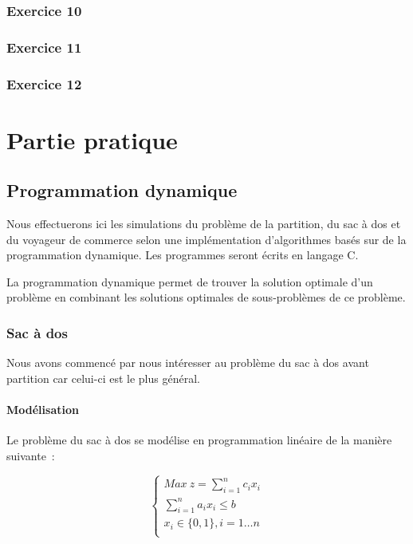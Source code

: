 \documentclass[a4paper, 12pt]{article}
\begin{document}
\subsubsection*{Exercice 10}


\subsubsection*{Exercice 11}


\subsubsection*{Exercice 12}


\pagebreak

\section{Partie pratique}

\subsection{Programmation dynamique}

Nous effectuerons ici les simulations du problème de la partition, du sac
à dos et du voyageur de commerce selon une implémentation
d'algorithmes basés sur de la programmation dynamique. Les programmes
seront écrits en langage C.

La programmation dynamique permet de trouver la solution optimale d'un
problème en combinant les solutions optimales de sous-problèmes de ce
problème.

\subsubsection{Sac à dos}

Nous avons commencé par nous intéresser au problème du sac à dos avant
partition car celui-ci est le plus général.

\paragraph{Modélisation}

Le problème du sac à dos se modélise en programmation linéaire de la
manière suivante~:

\begin{equation}
\begin{cases}
Max~z=\sum_{i=1}^nc_ix_i \\
\sum_{i=1}^na_ix_i \leq b \\
x_i \in\{0, 1\}, i=1\dots n\\
\end{cases}
\end{equation}
\end{document}
